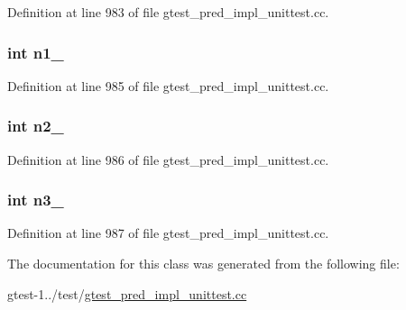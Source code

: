 \-Definition at line 983 of file gtest\-\_\-pred\-\_\-impl\-\_\-unittest.\-cc.

\hypertarget{classPredicate3Test_a7a61c539c18d10f12696fc25b115d699}{
\subsubsection[{n1\-\_\-}]{\setlength{\rightskip}{0pt plus 5cm}int {\bf n1\-\_\-}}}\label{d5/d43/classPredicate3Test_a7a61c539c18d10f12696fc25b115d699}


\-Definition at line 985 of file gtest\-\_\-pred\-\_\-impl\-\_\-unittest.\-cc.

\hypertarget{classPredicate3Test_a7dc886196252de63d1ca064997069377}{
\subsubsection[{n2\-\_\-}]{\setlength{\rightskip}{0pt plus 5cm}int {\bf n2\-\_\-}}}\label{d5/d43/classPredicate3Test_a7dc886196252de63d1ca064997069377}


\-Definition at line 986 of file gtest\-\_\-pred\-\_\-impl\-\_\-unittest.\-cc.

\hypertarget{classPredicate3Test_a08d9124d5401436eacd3e57dae0dbe2f}{
\subsubsection[{n3\-\_\-}]{\setlength{\rightskip}{0pt plus 5cm}int {\bf n3\-\_\-}}}\label{d5/d43/classPredicate3Test_a08d9124d5401436eacd3e57dae0dbe2f}


\-Definition at line 987 of file gtest\-\_\-pred\-\_\-impl\-\_\-unittest.\-cc.



\-The documentation for this class was generated from the following file\-:\begin{DoxyCompactItemize}
\item 
gtest-\/1../test/\hyperlink{gtest__pred__impl__unittest_8cc}{gtest\-\_\-pred\-\_\-impl\-\_\-unittest.\-cc}\end{DoxyCompactItemize}
